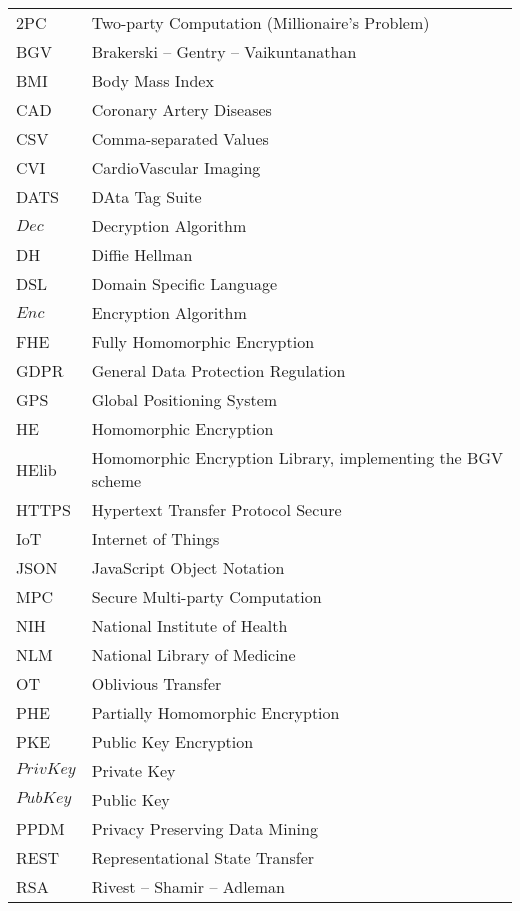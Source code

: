 \abbreviations
\begin{center}
	\renewcommand{\arraystretch}{1.5}
	\begin{longtable}{ l @{\qquad} l }
	\toprule
	2PC       & Two-party Computation (Millionaire's Problem) \\
	BGV       & Brakerski -- Gentry -- Vaikuntanathan \\
	BMI       & Body Mass Index \\
	CAD 			& Coronary Artery Diseases \\
	CSV 			& Comma-separated Values \\
	CVI 			& CardioVascular Imaging \\
	DATS 			& DAta Tag Suite \\
	$Dec$     & Decryption Algorithm \\
	DH				& Diffie Hellman \\
	DSL       & Domain Specific Language \\
	$Enc$     & Encryption Algorithm \\
	FHE       & Fully Homomorphic Encryption \\
	GDPR 			& General Data Protection Regulation\\
	GPS 			& Global Positioning System \\
	HE        & Homomorphic Encryption \\
	HElib     & Homomorphic Encryption Library, implementing the BGV scheme \\
	HTTPS 		& Hypertext Transfer Protocol Secure \\
	IoT				& Internet of Things \\
	JSON 			& JavaScript Object Notation \\
	MPC 			& Secure Multi-party Computation \\
	NIH 			& National Institute of Health \\
	NLM 			& National Library of Medicine \\
	OT        & Oblivious Transfer \\
	PHE       & Partially Homomorphic Encryption \\
	PKE 			& Public Key Encryption \\
	$PrivKey$	& Private Key \\
	$PubKey$  & Public Key \\
	PPDM      & Privacy Preserving Data Mining \\
	REST      & Representational State Transfer \\
	RSA				& Rivest -- Shamir -- Adleman \\

\end{longtable}
\end{center}
